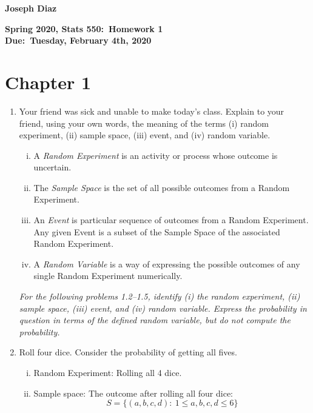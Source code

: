\documentclass{article}
\begin{document}
	\begin{large}
	\textbf{Joseph Diaz}
	\begin{center}
		\textbf{Spring 2020, Stats 550:\ Homework 1} \\
		\textbf{Due:\ Tuesday, February 4th, 2020} \\
	\end{center}
	\noindent\makebox[\linewidth]{\rule{\paperwidth}{0.4pt}}
	\section*{Chapter 1}
	\begin{enumerate}[1.]
		\item Your friend was sick and unable to make today’s class. Explain to your friend,
using your own words, the meaning of the terms (i) random experiment, (ii)
sample space, (iii) event, and (iv) random variable.
		\begin{enumerate}[i.]
			\item A \textit{Random Experiment} is an activity or process whose outcome is uncertain.
		
			\item The \textit{Sample Space} is the set of all possible outcomes from a Random Experiment.
		
			\item An \textit{Event} is particular sequence of outcomes from a Random Experiment. Any given Event is a subset of the Sample Space of the associated Random Experiment.
		
			\item A \textit{Random Variable} is a way of expressing the possible outcomes of any single Random Experiment numerically.
			
		\end{enumerate}
		

		\textit{For the following problems 1.2–1.5, identify (i) the random experiment, (ii)
sample space, (iii) event, and (iv) random variable. Express the probability
in question in terms of the defined random variable, but do not compute the
probability.	}
		
		\item Roll four dice. Consider the probability of getting all fives.
		\begin{enumerate}[i.]
			\item Random Experiment: Rolling all 4 dice.
		
			\item Sample space: The outcome after rolling all four dice:$$S = \{(a,b,c,d) :\ 1 \leq a,b,c,d \leq 6\}$$
		

\end{enumerate}
\end{enumerate}
\end{large}
\end{document}
